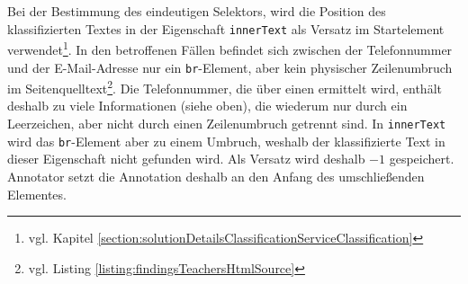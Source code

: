     Bei der Bestimmung des eindeutigen Selektors,
    wird die Position des klassifizierten Textes in der Eigenschaft
    \texttt{innerText} als Versatz im Startelement
    verwendet\footnote{vgl. Kapitel \ref{section:solutionDetailsClassificationServiceClassification}}.
    In den betroffenen Fällen befindet sich zwischen der Telefonnummer
    und der E-Mail-Adresse nur ein \texttt{br}-Element,
    aber kein physischer Zeilenumbruch im
    Seitenquelltext\footnote{vgl. Listing \ref{listing:findingsTeachersHtmlSource}}.
    Die Telefonnummer, die über einen {\xpathSelector} ermittelt wird,
    enthält deshalb zu viele Informationen (siehe oben),
    die wiederum nur durch ein Leerzeichen, aber nicht durch einen Zeilenumbruch getrennt sind.
    In \texttt{innerText} wird das \texttt{br}-Element aber zu einem Umbruch,
    weshalb der klassifizierte Text in dieser Eigenschaft nicht gefunden wird.
    Als Versatz wird deshalb $-1$ gespeichert.
    Annotator setzt die Annotation deshalb an den Anfang des umschließenden Elementes.
